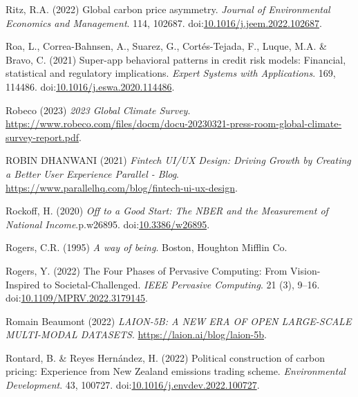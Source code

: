 \documentclass[
  letterpaper,
  DIV=11,
  numbers=noendperiod]{scrartcl}
\newlength{\cslhangindent}
\newenvironment{CSLReferences}[2] %
 {\begin{list}{}{%
  \setlength{\itemindent}{0pt}
  \setlength{\leftmargin}{0pt}
  \setlength{\parsep}{0pt}
  \ifodd #1
   \setlength{\leftmargin}{\cslhangindent}
   \setlength{\itemindent}{-1\cslhangindent}
  \fi
  \setlength{\itemsep}{#2\baselineskip}}}
 {\end{list}}
\begin{document}
\begin{CSLReferences}{0}{1}
Ritz, R.A. (2022) Global carbon price asymmetry. \emph{Journal of
Environmental Economics and Management}. 114, 102687.
doi:\href{https://doi.org/10.1016/j.jeem.2022.102687}{10.1016/j.jeem.2022.102687}.

Roa, L., Correa-Bahnsen, A., Suarez, G., Cortés-Tejada, F., Luque, M.A.
\& Bravo, C. (2021) Super-app behavioral patterns in credit risk models:
{Financial}, statistical and regulatory implications. \emph{Expert
Systems with Applications}. 169, 114486.
doi:\href{https://doi.org/10.1016/j.eswa.2020.114486}{10.1016/j.eswa.2020.114486}.

Robeco (2023) \emph{2023 {Global Climate Survey}}.
\url{https://www.robeco.com/files/docm/docu-20230321-press-room-global-climate-survey-report.pdf}.

ROBIN DHANWANI (2021) \emph{Fintech {UI}/{UX Design}: {Driving Growth}
by {Creating} a {Better User Experience} {\textbar} {Parallel} -
{Blog}}. \url{https://www.parallelhq.com/blog/fintech-ui-ux-design}.

Rockoff, H. (2020) \emph{Off to a {Good Start}: {The NBER} and the
{Measurement} of {National Income}}.p.w26895.
doi:\href{https://doi.org/10.3386/w26895}{10.3386/w26895}.

Rogers, C.R. (1995) \emph{A way of being}. Boston, Houghton Mifflin Co.

Rogers, Y. (2022) The {Four Phases} of {Pervasive Computing}: {From
Vision-Inspired} to {Societal-Challenged}. \emph{IEEE Pervasive
Computing}. 21 (3), 9--16.
doi:\href{https://doi.org/10.1109/MPRV.2022.3179145}{10.1109/MPRV.2022.3179145}.

Romain Beaumont (2022) \emph{{LAION-5B}: {A NEW ERA OF OPEN LARGE-SCALE
MULTI-MODAL DATASETS}}. \url{https://laion.ai/blog/laion-5b}.

Rontard, B. \& Reyes Hernández, H. (2022) Political construction of
carbon pricing: {Experience} from {New Zealand} emissions trading
scheme. \emph{Environmental Development}. 43, 100727.
doi:\href{https://doi.org/10.1016/j.envdev.2022.100727}{10.1016/j.envdev.2022.100727}.


\end{CSLReferences}
\end{document}
